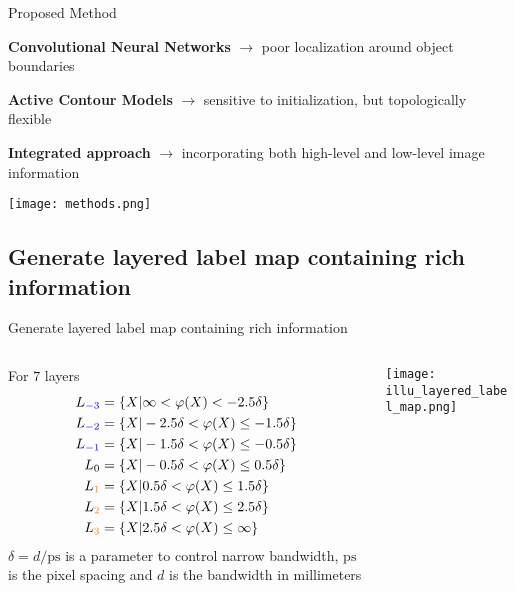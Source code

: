 
\begin{frame}{Proposed Method}
 
    \textbf{Convolutional Neural Networks} $\rightarrow$ poor localization around object boundaries 
    
    \textbf{Active Contour Models} $\rightarrow$ sensitive to initialization, but topologically flexible

    \textbf{Integrated approach} $\rightarrow$ incorporating both high-level and low-level image information

    \vfill
    {\centering\texttt{[image: methods.png]}}

\end{frame}


\subsection{Generate layered label map containing rich information}
\begin{frame}{Generate layered label map containing rich information}
    \begin{columns}
        \begin{column}{.4\textwidth}
            For $7$ layers
            \begin{align*}
                L_{\textcolor{blue}{-3}} &= \lbrace X | \infty < \varphi(X) < -2.5 \delta \rbrace \\
                L_{\textcolor{blue}{-2}} &= \lbrace X | -2.5 \delta < \varphi(X) \leq -1.5 \delta \rbrace \\
                L_{\textcolor{blue}{-1}} &= \lbrace X | -1.5 \delta < \varphi(X) \leq -0.5 \delta \rbrace \\
                L_{0} &= \lbrace X | -0.5 \delta < \varphi(X) \leq 0.5 \delta \rbrace \\
                L_{\textcolor{orange}{1}} &= \lbrace X | 0.5 \delta < \varphi(X) \leq 1.5 \delta \rbrace \\
                L_{\textcolor{orange}{2}} &= \lbrace X | 1.5 \delta < \varphi(X) \leq 2.5 \delta \rbrace \\
                L_{\textcolor{orange}{3}} &= \lbrace X | 2.5 \delta < \varphi(X) \leq \infty \rbrace
            \end{align*}
            $\delta = d/\textrm{ps}$ is a parameter to control narrow bandwidth, $\textrm{ps}$ is the pixel spacing and $d$ is the bandwidth in millimeters
            \tiny{}
        \end{column}
    \hspace{.8cm}
    \begin{column}{.6\textwidth}
    \texttt{[image: illu\_layered\_label\_map.png]}
    \end{column}
    \end{columns}
\end{frame}

